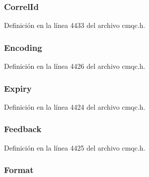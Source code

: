 \subsubsection[{Correl\+Id}]{ Correl\+Id}\label{structtag_m_q_m_d_acac8d73138c2c618b41a274eb92e5f2a}


Definición en la línea 4433 del archivo cmqc.\+h.

\hypertarget{structtag_m_q_m_d_a30167bf454a49a60fd3fe4e9e586af34}{}
\subsubsection[{Encoding}]{ Encoding}\label{structtag_m_q_m_d_a30167bf454a49a60fd3fe4e9e586af34}


Definición en la línea 4426 del archivo cmqc.\+h.

\hypertarget{structtag_m_q_m_d_a85cb54f2f2a97fe071fcad54d22a92a9}{}
\subsubsection[{Expiry}]{ Expiry}\label{structtag_m_q_m_d_a85cb54f2f2a97fe071fcad54d22a92a9}


Definición en la línea 4424 del archivo cmqc.\+h.

\hypertarget{structtag_m_q_m_d_a9cb2f407eb097aa9cdc246dc18059987}{}
\subsubsection[{Feedback}]{ Feedback}\label{structtag_m_q_m_d_a9cb2f407eb097aa9cdc246dc18059987}


Definición en la línea 4425 del archivo cmqc.\+h.

\hypertarget{structtag_m_q_m_d_a435a478822008713f8aaff89f369ed63}{}
\subsubsection[{Format}]{ Format}\label{structtag_m_q_m_d_a435a478822008713f8aaff89f369ed63}



